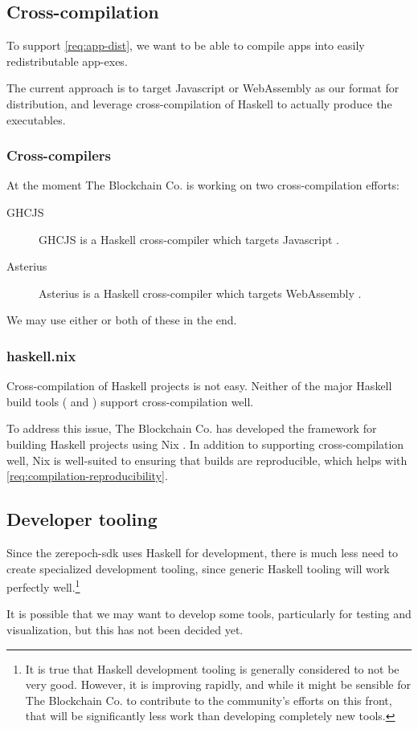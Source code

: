 \subsection{Cross-compilation}
\label{sec:cross-compilation}

To support \cref{req:app-dist}, we want to be able to compile \glspl{app} into easily redistributable \glspl{app-exe}.

The current approach is to target Javascript or WebAssembly as our format for distribution, and leverage cross-compilation of Haskell to actually produce the executables.

\subsubsection{Cross-compilers}

At the moment The Blockchain Co. is working on two cross-compilation efforts:
\begin{description}
  \item[GHCJS] GHCJS is a Haskell cross-compiler which targets Javascript \autocite{ghcjs-repo}.
  \item[Asterius] Asterius is a Haskell cross-compiler which targets WebAssembly \autocite{asterius-repo}.
\end{description}

\noindent We may use either or both of these in the end.

\subsubsection{haskell.nix}

Cross-compilation of Haskell projects is not easy.
Neither of the major Haskell build tools ( and ) support cross-compilation well.

To address this issue, The Blockchain Co. has developed the  framework for building Haskell projects using Nix \autocite{haskell-nix-repo}.
In addition to supporting cross-compilation well, Nix is well-suited to ensuring that builds are reproducible, which helps with \cref{req:compilation-reproducibility}.

\subsection{Developer tooling}
\label{sec:tooling}

Since the \gls{zerepoch-sdk} uses Haskell for development, there is much less need to create specialized development tooling, since generic Haskell tooling will work perfectly well.\footnote{
It is true that Haskell development tooling is generally considered to not be very good.
However, it is improving rapidly, and while it might be sensible for The Blockchain Co. to contribute to the community's efforts on this front, that will be significantly less work than developing completely new tools.
}

It is possible that we may want to develop some tools, particularly for testing and visualization, but this has not been decided yet.
